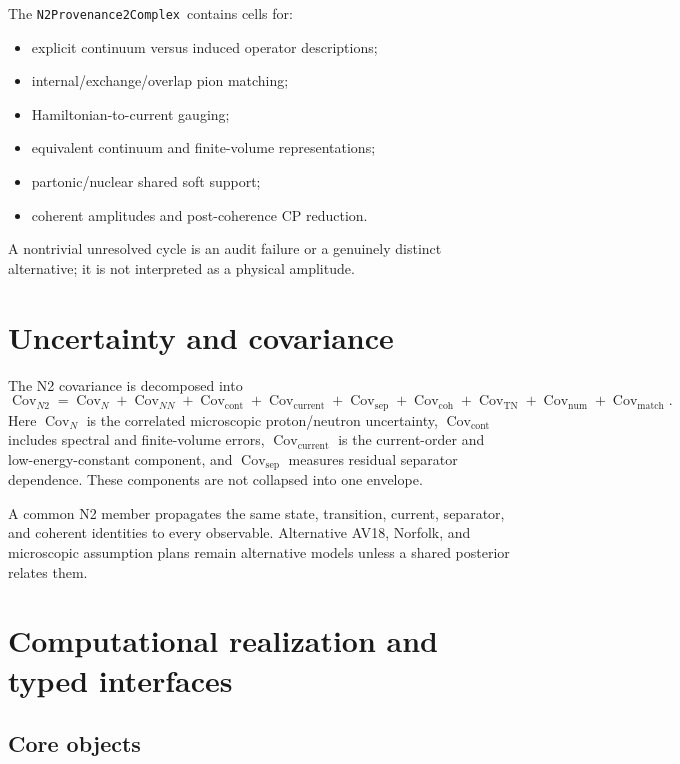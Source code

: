 \documentclass[11pt]{article}
\newcommand{\Cov}{\operatorname{Cov}}
\newcommand{\num}{\mathrm{num}}
\newcommand{\ProvComplex}{\texttt{N2\allowbreak Provenance2\allowbreak Complex}}
\begin{document}
The \ProvComplex\ contains cells for:
\begin{itemize}
\item explicit continuum versus induced operator descriptions;
\item internal/exchange/overlap pion matching;
\item Hamiltonian-to-current gauging;
\item equivalent continuum and finite-volume representations;
\item partonic/nuclear shared soft support;
\item coherent amplitudes and post-coherence CP reduction.
\end{itemize}
A nontrivial unresolved cycle is an audit failure or a genuinely distinct
alternative; it is not interpreted as a physical amplitude.

\section{Uncertainty and covariance}
\label{sec:uncertainty}

The N2 covariance is decomposed into
\begin{equation}
 \Cov_{N2}
 =\Cov_{N}
 +\Cov_{NN}
 +\Cov_{\mathrm{cont}}
 +\Cov_{\mathrm{current}}
 +\Cov_{\mathrm{sep}}
 +\Cov_{\mathrm{coh}}
 +\Cov_{\mathrm{TN}}
 +\Cov_{\num}
 +\Cov_{\mathrm{match}}.
 \label{eq:n2-covariance}
\end{equation}
Here \(\Cov_N\) is the correlated microscopic proton/neutron uncertainty,
\(\Cov_{\mathrm{cont}}\) includes spectral and finite-volume errors,
\(\Cov_{\mathrm{current}}\) is the current-order and low-energy-constant
component, and \(\Cov_{\mathrm{sep}}\) measures residual separator dependence.
These components are not collapsed into one envelope.

A common N2 member propagates the same state, transition, current, separator,
and coherent identities to every observable.  Alternative AV18, Norfolk, and
microscopic assumption plans remain alternative models unless a shared
posterior relates them.

\section{Computational realization and typed interfaces}
\label{sec:software}

\subsection{Core objects}
\end{document}
